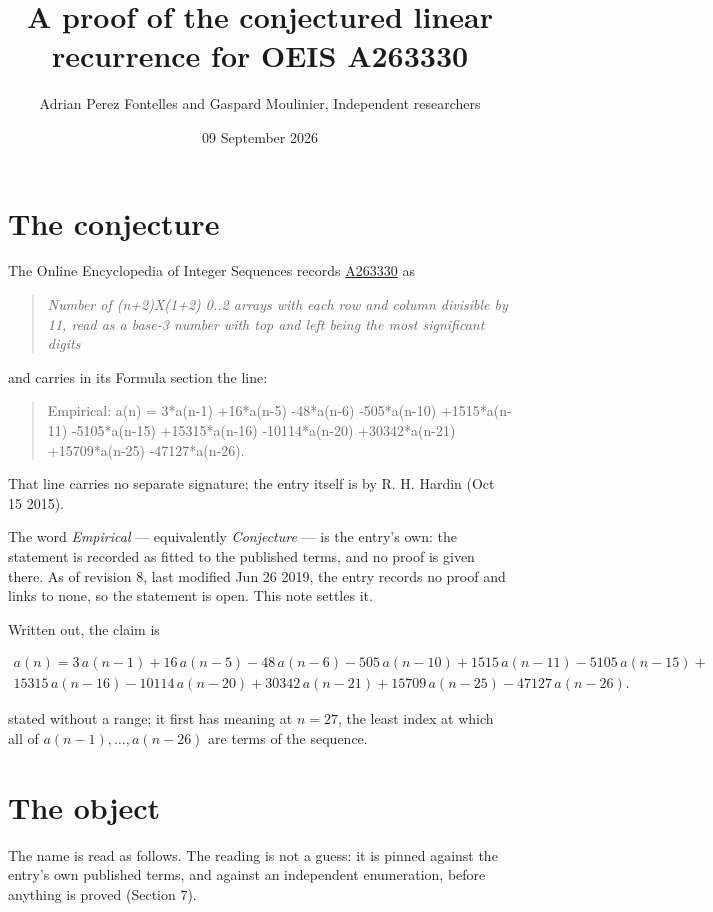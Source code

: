 \documentclass[11pt]{article}
\title{A proof of the conjectured linear recurrence for OEIS A263330}
\author{Adrian Perez Fontelles and Gaspard Moulinier, Independent researchers}
\date{09 September 2026}
\theoremstyle{definition}
\begin{document}
\maketitle
\section{The conjecture}

The Online Encyclopedia of Integer Sequences records \href{https://oeis.org/A263330}{A263330} as

\begin{quote}\itshape Number of (n+2)X(1+2) 0..2 arrays with each row and column divisible by 11, read as a base-3 number with top and left being the most significant digits\end{quote}

and carries in its Formula section the line:

\begin{quote}\ttfamily Empirical: a(n) = 3*a(n-1) +16*a(n-5) -48*a(n-6) -505*a(n-10) +1515*a(n-11) -5105*a(n-15) +15315*a(n-16) -10114*a(n-20) +30342*a(n-21) +15709*a(n-25) -47127*a(n-26).\end{quote}

That line carries no separate signature; the entry itself is by R. H. Hardin (Oct 15 2015).

The word {\itshape Empirical} --- equivalently {\itshape Conjecture} --- is the entry's own: the statement is recorded as fitted to the published terms, and no proof is given there. As of revision 8, last modified Jun 26 2019, the entry records no proof and links to none, so the statement is open. This note settles it.

Written out, the claim is

\begin{multline*} a(n) = 3\,a(n-1) + 16\,a(n-5) - 48\,a(n-6) - 505\,a(n-10) + 1515\,a(n-11) - 5105\,a(n-15) + \\ 15315\,a(n-16) - 10114\,a(n-20) + 30342\,a(n-21) + 15709\,a(n-25) - 47127\,a(n-26). \end{multline*}

stated without a range; it first has meaning at $n = 27$, the least index at which all of $a(n-1),\dots,a(n-26)$ are terms of the sequence.

\section{The object}

The name is read as follows. The reading is not a guess: it is pinned against the entry's own published terms, and against an independent enumeration, before anything is proved (Section 7).
\end{document}
